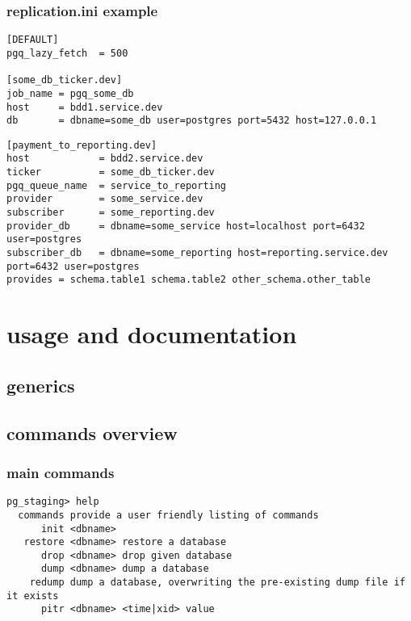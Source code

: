 \documentclass{beamer}
\begin{document}
\begin{frame}[fragile]
  \frametitle{replication.ini example}

\begin{overprint}

\begin{verbatim}
[DEFAULT]
pgq_lazy_fetch  = 500

[some_db_ticker.dev]
job_name = pgq_some_db
host     = bdd1.service.dev
db       = dbname=some_db user=postgres port=5432 host=127.0.0.1
\end{verbatim}

\begin{verbatim}
[payment_to_reporting.dev]
host            = bdd2.service.dev
ticker          = some_db_ticker.dev
pgq_queue_name  = service_to_reporting
provider        = some_service.dev
subscriber      = some_reporting.dev
provider_db     = dbname=some_service host=localhost port=6432 user=postgres
subscriber_db   = dbname=some_reporting host=reporting.service.dev port=6432 user=postgres
provides = schema.table1 schema.table2 other_schema.other_table
\end{verbatim}
\end{overprint}
\end{frame}

\section{usage and documentation}
\subsection{generics}


\subsection{commands overview}
\begin{frame}[fragile]
  \frametitle{main commands}

\begin{verbatim}
pg_staging> help
  commands provide a user friendly listing of commands
      init <dbname>
   restore <dbname> restore a database
      drop <dbname> drop given database
      dump <dbname> dump a database
    redump dump a database, overwriting the pre-existing dump file if it exists
      pitr <dbname> <time|xid> value
\end{verbatim}
\end{frame}
\end{document}

